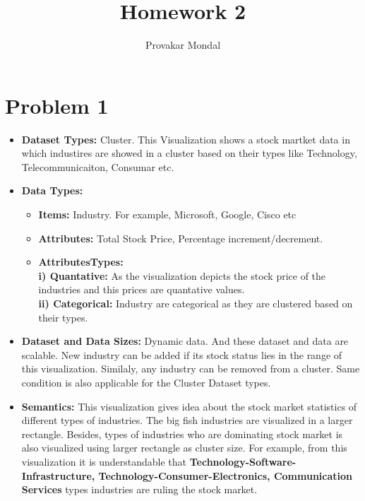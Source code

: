 \documentclass{article}
\title{Homework 2}
\author{Provakar Mondal}
\date{}
\begin{document}
\maketitle
\section{Problem 1}

\begin{itemize}

 \item \textbf{Dataset Types:} Cluster. This Visualization shows a stock martket data in which industires are showed in a cluster based on their types like Technology, Telecommunicaiton, Consumar etc.
 
 \item \textbf{Data Types:}
 	\begin{itemize}
 		\item \textbf{Items:} Industry. For example, Microsoft, Google, Cisco etc
 		\item \textbf{Attributes:} Total Stock Price, Percentage increment/decrement.
 		\item \textbf{Attributes\hspace{2mm}Types:} \\ \textbf{i) Quantative:} As the visualization depicts the stock price of the industries and this prices are quantative values. \\
 		\textbf{ii) Categorical:} Industry are categorical as they are clustered based on their types. 
 	
	\end{itemize}
	
\item \textbf{Dataset and Data Sizes:} Dynamic data. And these dataset and data are scalable. New industry can be added if its stock status lies in the range of this visualization. Similaly, any industry can be removed from a cluster.\linebreak
Same condition is also applicable for the Cluster Dataset types. 

\item \textbf{Semantics:} This visualization gives idea about the stock market statistics of different types of industries. The big fish industries are visualized in a larger rectangle. Besides, types of industries who are dominating stock market is also visualized using larger rectangle as cluster size. For example, from this visualization it is understandable that \textbf{Technology-Software-Infrastructure, Technology-Consumer-Electronics, Communication Services} types industries are ruling the stock market. 
 
\end{itemize}
\end{document}
